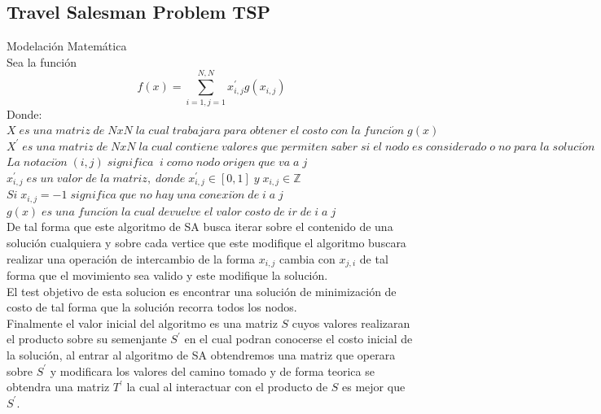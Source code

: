 \documentclass[10pt]{article}
\begin{document}
\subsection{Travel Salesman Problem TSP}
Modelación Matemática\\
Sea la función
\[f(x)=\sum_{i=1,j=1}^{N,N}x^{'}_{i,j}g(x_{i,j})\]
Donde:\\
\(\displaystyle X\;es\;una\;matriz\;de\;NxN\;la\;cual\;trabajara\;para\;obtener\;el\;costo\;con\;la\;funci\acute{o}n\;g(x)\)\\\vspace{0.25cm}
\(\displaystyle X^{'}\;es\;una\;matriz\;de\;NxN\;la\;cual\;contiene\;valores\;que\;permiten\;saber\;si\;el\;nodo\;es\;considerado\;o\;no\;para\;la\;soluci\acute{o}n\;\)\\\vspace{0.25cm}
\(\displaystyle La\;notaci\acute{o}n\;(i,j)\;significa\;\;i\;como\;nodo\;origen\;que\;va\;a\;j\)\\\vspace{0.25cm}
\(\displaystyle x^{'}_{i,j}\;es\;un\;valor\;de\;la\;matriz,\;donde\;x^{'}_{i,j}\in[0,1]\;y\;x_{i,j}\in\mathbb{Z}\)\\\vspace{0.25cm}
\(\displaystyle Si\;x_{i,j}=-1\;significa\;que\;no\;hay\;una\;conexi\acute{o}n\;de\;i\;a\;j\)\\\vspace{0.25cm}
\(\displaystyle g(x)\;es\;una\;funci\acute{o}n\;la\;cual\;devuelve\;el\;valor\;costo\;de\;ir\;de\;i\;a\;j\)\\\vspace{0.25cm}
De tal forma que este algoritmo de SA busca iterar sobre el contenido de una solución cualquiera y sobre cada vertice que este modifique el algoritmo buscara realizar una operación de intercambio de la forma $x_{i,j}$ cambia con $x_{j,i}$ de tal forma que el movimiento sea valido y este modifique la solución.\\
El test objetivo de esta solucion es encontrar una solución de minimización de costo de tal forma que la solución recorra todos los nodos.\\
Finalmente el valor inicial del algoritmo es una matriz $S$ cuyos valores realizaran el producto sobre su semenjante $S^{'}$ en el cual podran conocerse el costo inicial de la solución, al entrar al algoritmo de SA obtendremos una matriz que operara sobre $S^{'}$ y modificara los valores del camino tomado y de forma teorica se obtendra una matriz $T^{'}$ la cual al interactuar con el producto de $S$ es mejor que $S^{'}$.\vspace{0.5cm}
\end{document}

